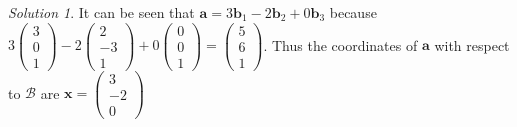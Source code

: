 \documentclass[
]{book}
\theoremstyle{definition}
\theoremstyle{definition}
\theoremstyle{definition}
\theoremstyle{remark}
\newtheorem*{solution}{Solution}
\begin{document}
\begin{solution}

It can be seen that \(\mathbf{a} = 3 \mathbf{b}_1 - 2 \mathbf{b}_2 + 0 \mathbf{b}_3\) because \(3 \begin{pmatrix} 3 \\ 0 \\ 1 \end{pmatrix} - 2 \begin{pmatrix} 2 \\ -3 \\ 1 \end{pmatrix} + 0 \begin{pmatrix} 0 \\ 0 \\ 1 \end{pmatrix} = \begin{pmatrix} 5 \\ 6 \\ 1 \end{pmatrix}\). Thus the coordinates of \(\mathbf{a}\) with respect to \(\mathcal{B}\) are \(\mathbf{x} = \begin{pmatrix} 3 \\ -2 \\ 0 \end{pmatrix}\)


\end{solution}
\end{document}

